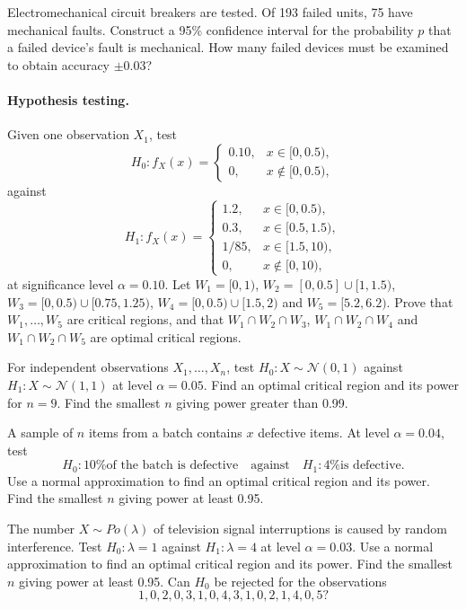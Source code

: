 \documentclass[a4paper]{report}
\begin{document}
\begin{problem}
Electromechanical circuit breakers are tested. Of 193 failed units, 75 have mechanical faults. Construct a 95\% confidence interval for the probability $p$ that a failed device's fault is mechanical. How many failed devices must be examined to obtain accuracy $\pm0.03$?
\end{problem}
\paragraph{Hypothesis testing.}
\begin{problem}
Given one observation $X_1$, test
\[H_0:f_X(x)=\begin{cases}0.10,&x\in[0,0.5),\\0,&x\notin[0,0.5),\end{cases}\]
against
\[H_1:f_X(x)=\begin{cases}1.2,&x\in[0,0.5),\\0.3,&x\in[0.5,1.5),\\1/85,&x\in[1.5,10),\\0,&x\notin[0,10),\end{cases}\]
at significance level $\alpha=0.10$. Let $W_1=[0,1)$, $W_2=[0,0.5]\cup[1,1.5)$, $W_3=[0,0.5)\cup[0.75,1.25)$, $W_4=[0,0.5)\cup[1.5,2)$ and $W_5=[5.2,6.2)$. Prove that $W_1,\dots,W_5$ are critical regions, and that $W_1\cap W_2\cap W_3$, $W_1\cap W_2\cap W_4$ and $W_1\cap W_2\cap W_5$ are optimal critical regions.
\end{problem}
\begin{problem}
For independent observations $X_1,\dots,X_n$, test $H_0:X\sim\mathcal N(0,1)$ against $H_1:X\sim\mathcal N(1,1)$ at level $\alpha=0.05$. Find an optimal critical region and its power for $n=9$. Find the smallest $n$ giving power greater than 0.99.
\end{problem}
\begin{problem}
A sample of $n$ items from a batch contains $x$ defective items. At level $\alpha=0.04$, test
\[H_0:\text{10\% of the batch is defective}\quad\text{against}\quad H_1:\text{4\% is defective}.\]
Use a normal approximation to find an optimal critical region and its power. Find the smallest $n$ giving power at least 0.95.
\end{problem}
\begin{problem}
The number $X\sim Po(\lambda)$ of television signal interruptions is caused by random interference. Test $H_0:\lambda=1$ against $H_1:\lambda=4$ at level $\alpha=0.03$. Use a normal approximation to find an optimal critical region and its power. Find the smallest $n$ giving power at least 0.95. Can $H_0$ be rejected for the observations
\[1,0,2,0,3,1,0,4,3,1,0,2,1,4,0,5?\]
\end{problem}
\end{document}
